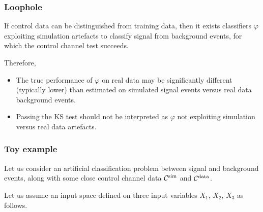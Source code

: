 \documentclass{beamer}
\begin{document}

\begin{frame}
\frametitle{Loophole}

If control data can be distinguished from training data,
then it exists classifiers $\varphi$ exploiting simulation artefacts
 to classify signal from background events, for which {\color{red}the
control channel test succeeds}.

\vspace{0.5cm}

Therefore,

\begin{itemize}

\item The true performance of $\varphi$ on real data may be significantly
different (typically lower) than estimated on simulated signal events versus
real data background events.

\item Passing the KS test should not be interpreted as $\varphi$
not exploiting simulation versus real data artefacts.

\end{itemize}

\end{frame}


\begin{frame}
\frametitle{Toy example}

Let us consider an artificial classification problem between signal and
background events, along with some close control channel data ${\cal
C}^\text{sim}$ and ${\cal C}^\text{data}$.

\vspace{0.5cm}

Let us assume an input space defined on three input variables $X_1$, $X_2$,
$X_3$ as follows.

\end{frame}

\end{document}
